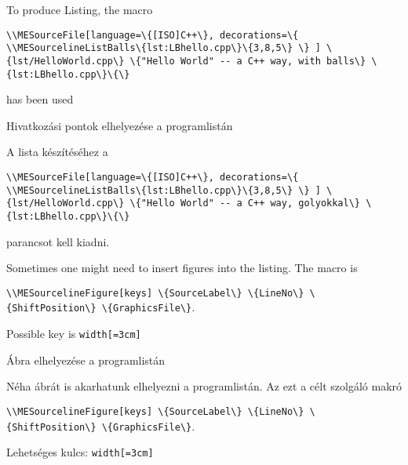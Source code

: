 {
To produce Listing\ao{ \ref{lst:LBhello.cpp}}, the macro

\par\noindent\lstinline|\\MESourceFile[language=\{[ISO]C++\},
decorations=\{
\\MESourcelineListBalls\{lst:LBhello.cpp\}\{3,8,5\}
\}
] \{lst/HelloWorld.cpp\} \{"Hello World" -- a C++ way, with balls\} \{lst:LBhello.cpp\}\{\}|
\par\noindent has been used

}
{Hivatkozási pontok elhelyezése a programlistán}
{
A \ao{\ref{lst:LBhello.cpp}} lista készítéséhez a
\par\noindent\lstinline|\\MESourceFile[language=\{[ISO]C++\},
decorations=\{
\\MESourcelineListBalls\{lst:LBhello.cpp\}\{3,8,5\}
\}
] \{lst/HelloWorld.cpp\} \{"Hello World" -- a C++ way, golyokkal\} \{lst:LBhello.cpp\}\{\}|
\par\noindent parancsot kell kiadni.

}



{
Sometimes one might need to insert figures into the listing.
The macro is
\par\noindent\lstinline|\\MESourcelineFigure[keys] \{SourceLabel\} \{LineNo\} \{ShiftPosition\} \{GraphicsFile\}|.
\par\noindent Possible key is \lstinline|width[=3cm]|

}
{Ábra elhelyezése a programlistán}
{
Néha ábrát is akarhatunk elhelyezni a programlistán.
Az ezt a célt szolgáló makró
\par\noindent\lstinline|\\MESourcelineFigure[keys] \{SourceLabel\} \{LineNo\} \{ShiftPosition\} \{GraphicsFile\}|.
\par\noindent Lehetséges kulcs: \lstinline|width[=3cm]|
}

